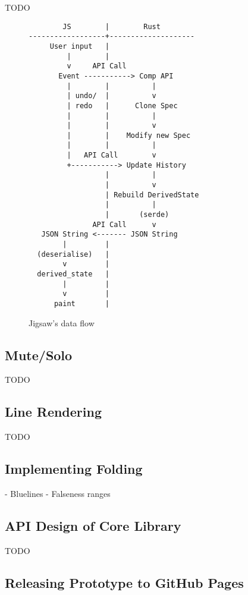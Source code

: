 \documentclass[12pt]{article}
\begin{document}
TODO

\begin{figure}
    \begin{verbatim}
        JS        |        Rust
------------------+--------------------
     User input   |
         |        |
         v     API Call
       Event -----------> Comp API
         |        |          |
         | undo/  |          v
         | redo   |      Clone Spec
         |        |          |
         |        |          v
         |        |    Modify new Spec
         |        |          |
         |   API Call        v
         +-----------> Update History
                  |          |
                  |          v
                  | Rebuild DerivedState
                  |          |
                  |       (serde)
               API Call      v
   JSON String <------- JSON String
        |         |
  (deserialise)   |
        v         |
  derived_state   |
        |         |
        v         |
      paint       |
    \end{verbatim}
    \caption{Jigsaw's data flow}\label{fig:app_data_flow}
\end{figure}

\subsection{Mute/Solo}

TODO

\subsection{Line Rendering}

TODO

\subsection{Implementing Folding}

- Bluelines
- Falseness ranges

\subsection{API Design of Core Library}

TODO

\subsection{Releasing Prototype to GitHub Pages}
\end{document}
